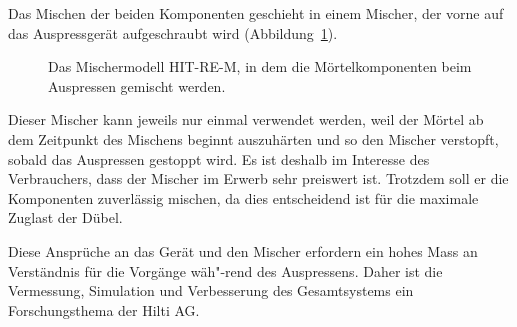 %
Das Mischen der beiden Komponenten geschieht in einem Mischer, der vorne auf das Auspressgerät aufgeschraubt wird (Abbildung~\ref{fig:Mischer}).
%
\begin{figure}
    \centering
    \caption{Das Mischermodell HIT-RE-M, in dem die Mörtelkomponenten beim Auspressen gemischt werden.}
    \label{fig:Mischer}
\end{figure}
%
Dieser Mischer kann jeweils nur einmal verwendet werden, weil der Mörtel ab dem Zeitpunkt des Mischens beginnt auszuhärten und so den Mischer verstopft, sobald das Auspressen gestoppt wird. Es ist deshalb im Interesse des Verbrauchers, dass der Mischer im Erwerb sehr preiswert ist. Trotzdem soll er die Komponenten zuverlässig mischen, da dies entscheidend ist für die maximale Zuglast der Dübel.

Diese Ansprüche an das Gerät und den Mischer erfordern ein hohes Mass an Verständnis für die Vorgänge wäh"-rend des Auspressens. Daher ist die Vermessung, Simulation und Verbesserung des Gesamtsystems ein Forschungsthema der Hilti AG.
%
